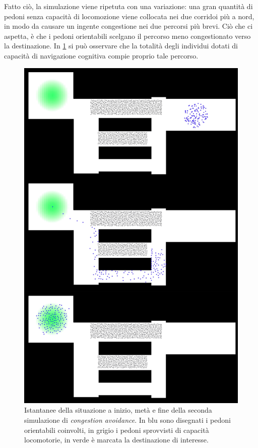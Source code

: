 \documentclass[12pt,a4paper,openright,oneside]{book}
\begin{document}
Fatto ciò, la simulazione viene ripetuta con una variazione: una gran quantità di pedoni senza capacità di locomozione viene collocata nei due corridoi più a nord, in modo da causare un ingente congestione nei due percorsi più brevi. Ciò che ci aspetta, è che i pedoni orientabili scelgano il percorso meno congestionato verso la destinazione. In \cref{fig:congestion-avoidance-2} si può osservare che la totalità degli individui dotati di capacità di navigazione cognitiva compie proprio tale percorso.
\begin{figure}
	\centering
	\includegraphics[width=0.5\linewidth]{figures/congestion-avoidance-2.png}
	\caption{Istantanee della situazione a inizio, metà e fine della seconda simulazione di \emph{congestion avoidance}. In blu sono disegnati i pedoni orientabili coinvolti, in grigio i pedoni sprovvisti di capacità locomotorie, in verde è marcata la destinazione di interesse.}
	\label{fig:congestion-avoidance-2}
\end{figure}

\end{document}
